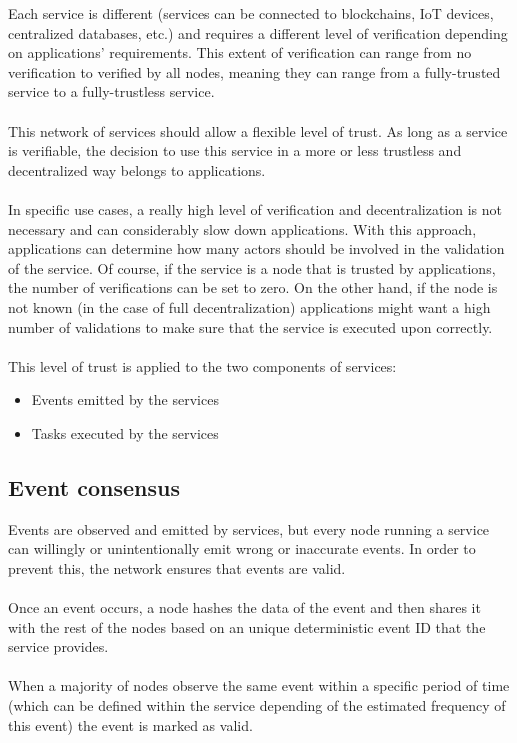 \documentclass[12pt,a4paper,final]{article}
\begin{document}
Each service is different (services can be connected to blockchains, IoT devices, centralized databases, etc.) and requires a different level of verification depending on applications’ requirements. This extent of verification can range from no verification to verified by all nodes, meaning they can range from a fully-trusted service to a fully-trustless service.
\\\\
This network of services should allow a flexible level of trust. As long as a service is verifiable, the decision to use this service in a more or less trustless and decentralized way belongs to applications.
\\\\
In specific use cases, a really high level of verification and decentralization is not necessary and can considerably slow down applications. With this approach, applications can determine how many actors should be involved in the validation of the service. Of course, if the service is a node that is trusted by applications, the number of verifications can be set to zero. On the other hand, if the node is not known (in the case of full decentralization) applications might want a high number of validations to make sure that the service is executed upon correctly.
\\\\
This level of trust is applied to the two components of services:

\begin{itemize}
\item Events emitted by the services
\item Tasks executed by the services
\end{itemize}

\subsection{Event consensus}

Events are observed and emitted by services, but every node running a service can willingly or unintentionally emit wrong or inaccurate events. In order to prevent this, the network ensures that events are valid.
\\\\
Once an event occurs, a node hashes the data of the event and then shares it with the rest of the nodes based on an unique deterministic event ID that the service provides. 
\\\\
When a majority of nodes observe the same event within a specific period of time (which can be defined within the service depending of the estimated frequency of this event) the event is marked as valid.
\end{document}

